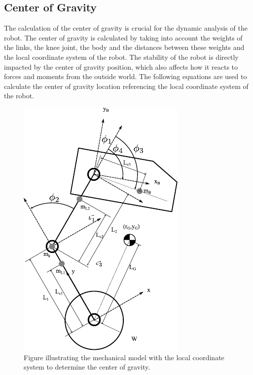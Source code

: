 \newpage
\subsection{Center of Gravity }
%
%
%
%

The calculation of the center of gravity is crucial for the dynamic analysis of the robot.
The center of gravity is calculated by taking into account the weights of the links, the knee joint, the body and the distances between these weights and the local coordinate system of the robot.
The stability of the robot is directly impacted by the center of gravity position, which also affects how it reacts to forces and moments from the outside world.
The following equations are used to calculate the center of gravity location referencing the local coordinate system of the robot.
	\begin{figure}[h]
		\centering
		\includegraphics[width=.5\textwidth]{Model}
		\caption[Mechanical model with the local coordinate system]{Figure illustrating the mechanical model with the local coordinate system to determine the center of gravity.}
		\label{Mechanical model with the local coordinate system}
	\end{figure}

